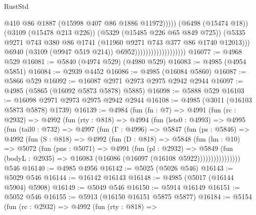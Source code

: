 \begin{lexlean}{RustStd}
\begin{coremodule}
                                                    @410
                                                    @86
                                                    @1887
                                                    (@15998 @407 @86 @1886 @11972)))))
                                            (@6498 (@15474 @18))
                                            (@3109 (@15478 @213 @226))
                                            (@5329 (@15485 @226 @65 @849 @725))
                                            (@5335
                                              @9271
                                              @743
                                              @380
                                              @86
                                              @1741
                                              (@11960 @9271 @743 @377 @86 @1740 @12013)))
                                          @6940
                                          (@3109 (@9947 @519 @214))
                                          @6952)))))))))))))))))))
@16077 := @4968 @529
@16081 := @5840 (@4974 @529) (@4980 @529)
@16083 := @4985 (@4954 @5851)
@16084 := @2939 @4452
@16086 := @4985 (@16084 @5860)
@16087 := @5866 @529
@16092 := @16087 @2971 @2973 @2975 @2942 @2944
@16097 := @4985 (@5865 (@16092 @5873 @5878) @5885)
@16098 := @5888 @529
@16103 := @16098 @2971 @2973 @2975 @2942 @2944
@16108 := @4985 (@3011 (@16103 @5873 @5878) @1739)
@16139 := @4984
    (fun (fn : @7) =>
    @4991
      (fun (rc : @2932) =>
      @4992
        (fun (rty : @818) =>
        @4994
          (fun (lets0 : @4993) =>
          @4995
            (fun (tail0 : @732) =>
            @4997
              (fun (Γ : @4996) =>
              @5847
                (fun (ps : @5846) =>
                @4992
                  (fun (S : @818) =>
                  @4992
                    (fun (D : @818) =>
                    @5848
                      (fun (hn : @10) =>
                      @5072
                        (fun (pns : @5071) =>
                        @4991
                          (fun (pl : @2932) =>
                          @5849
                            (fun (bodyL : @2935) =>
                            @16083 (@16086 (@16097 (@16108 @5922))))))))))))))))
    @546
@16140 := @4985 @4956
@16142 := @5025 (@5026 @546)
@16143 := @5029 @546
@16144 := @16142 @16143
@16148 := @4985 (@5017 (@16144 @5904) @5908)
@16149 := @5049 @546
@16150 := @5914 @16149
@16151 := @5052 @546
@16155 := @5913 (@16150 @16151 @5875 @5877)
@16184 := @5154
    (fun (rc : @2932) =>
    @4992
      (fun (rty : @818) =>

\end{coremodule}
\end{lexlean}
